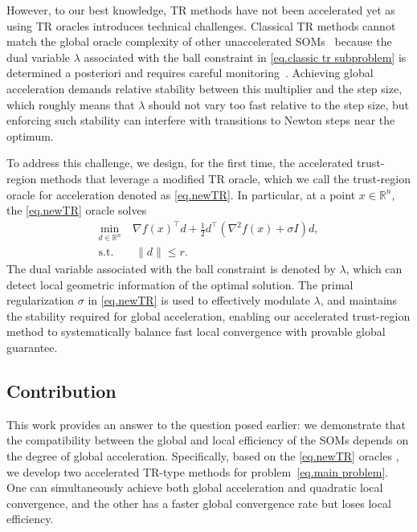 \documentclass[moor,sglanonrev]{informs4}
\begin{document}
However, to our best knowledge,  TR methods have not been accelerated yet as
using TR oracles introduces technical challenges. Classical TR methods cannot match the global oracle complexity of other unaccelerated SOMs~\cite{cartis2010on,curtis2017trust} because the dual variable $\lambda$ associated with the ball constraint in \eqref{eq.classic tr subproblem} is determined a posteriori and requires careful monitoring~\cite{curtis2018concise}. Achieving global acceleration demands relative stability between this multiplier and the step size, which roughly means that $\lambda$ should not vary too fast relative to the step size, but enforcing such stability can interfere with transitions to Newton steps near the optimum.

To address this challenge, we design, for the first time, the accelerated trust-region methods that leverage a modified TR oracle, which we call the trust-region oracle for acceleration denoted as \ref{eq.newTR}. In particular, at a point $x \in \mathbb{R}^n$, the \ref{eq.newTR} oracle solves
\begin{equation*}
    \begin{aligned}
        \min_{d \in \mathbb{R}^n}~ & \nabla f(x)^\top d
        + \tfrac{1}{2} d^\top (\nabla^2 f(x) + \sigma I) d, \\
        \text{s.t.}                & ~ \|d\| \le r.
    \end{aligned}
    \tag*{(TR$_+$)}
\end{equation*}
The dual variable associated with the ball constraint is denoted by $\lambda$, which can detect local geometric information of the optimal solution.
The primal regularization $\sigma$ in \ref{eq.newTR} is used to effectively modulate $\lambda$, and maintains the stability required for global acceleration, enabling our accelerated trust-region method to systematically balance fast local convergence with provable global guarantee.
\subsection{Contribution}
This work provides an answer to the question posed earlier: we demonstrate that the compatibility between the global and local efficiency of the SOMs depends on the degree of global acceleration.
Specifically, based on the \ref{eq.newTR} oracles \cite{jiang2026beyond}, we develop two accelerated TR-type methods for problem~\eqref{eq.main problem}. One can simultaneously achieve both global acceleration and quadratic local convergence, and the other has a faster global convergence rate but loses local efficiency.
\end{document}

